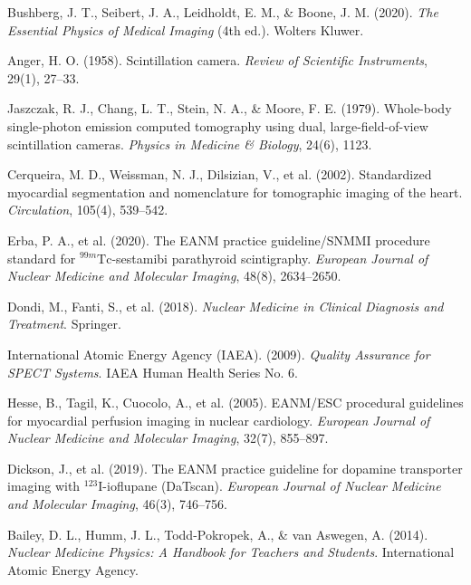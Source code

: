 \documentclass[11pt,a4paper]{article}
\begin{document}
\begin{enumerate}[label={[\arabic*]},leftmargin=*]
    \item Bushberg, J. T., Seibert, J. A., Leidholdt, E. M., \& Boone, J. M. (2020). \textit{The Essential Physics of Medical Imaging} (4th ed.). Wolters Kluwer.
    \item Anger, H. O. (1958). Scintillation camera. \textit{Review of Scientific Instruments}, 29(1), 27--33.
    \item Jaszczak, R. J., Chang, L. T., Stein, N. A., \& Moore, F. E. (1979). Whole-body single-photon emission computed tomography using dual, large-field-of-view scintillation cameras. \textit{Physics in Medicine \& Biology}, 24(6), 1123.
    \item Cerqueira, M. D., Weissman, N. J., Dilsizian, V., et al. (2002). Standardized myocardial segmentation and nomenclature for tomographic imaging of the heart. \textit{Circulation}, 105(4), 539--542.
    \item Erba, P. A., et al. (2020). The EANM practice guideline/SNMMI procedure standard for $^{99m}\text{Tc}$-sestamibi parathyroid scintigraphy. \textit{European Journal of Nuclear Medicine and Molecular Imaging}, 48(8), 2634--2650.
    \item Dondi, M., Fanti, S., et al. (2018). \textit{Nuclear Medicine in Clinical Diagnosis and Treatment}. Springer.
    \item International Atomic Energy Agency (IAEA). (2009). \textit{Quality Assurance for SPECT Systems}. IAEA Human Health Series No. 6.
    \item Hesse, B., Tagil, K., Cuocolo, A., et al. (2005). EANM/ESC procedural guidelines for myocardial perfusion imaging in nuclear cardiology. \textit{European Journal of Nuclear Medicine and Molecular Imaging}, 32(7), 855--897.
    \item Dickson, J., et al. (2019). The EANM practice guideline for dopamine transporter imaging with $^{123}\text{I}$-ioflupane (DaTscan). \textit{European Journal of Nuclear Medicine and Molecular Imaging}, 46(3), 746--756.
    \item Bailey, D. L., Humm, J. L., Todd-Pokropek, A., \& van Aswegen, A. (2014). \textit{Nuclear Medicine Physics: A Handbook for Teachers and Students}. International Atomic Energy Agency.
\end{enumerate}
\end{document}
